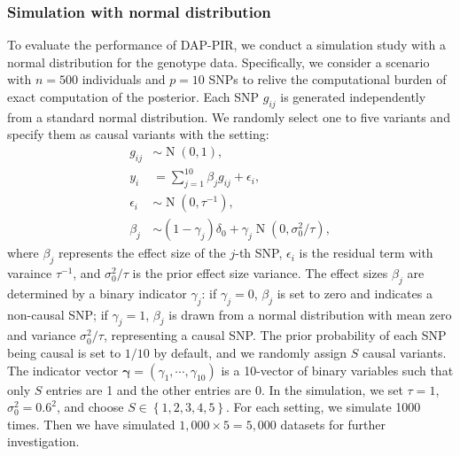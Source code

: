 \documentclass[pdflatex,sn-mathphys-num]{sn-jnl}%
\theoremstyle{thmstyleone}%
\theoremstyle{thmstyletwo}%
\theoremstyle{thmstylethree}%
\begin{document}
\subsubsection{Simulation with normal distribution}
To evaluate the performance of DAP-PIR, we conduct a simulation study with a normal distribution for the genotype data. Specifically, we consider a scenario with $n=500$ individuals and $p=10$ SNPs to relive the computational burden of exact computation of the posterior. Each SNP $g_{ij}$ is generated independently from a standard normal distribution. We randomly select one to five variants and specify them as causal variants with the setting:
\begin{align}
    g_{ij} &\sim \operatorname{N}\left(0,1\right),\\
    y_i &= \sum_{j=1}^{10} \beta_j g_{ij}  + \epsilon_i,\\
    \epsilon_i &\sim \operatorname{N}(0, \tau^{-1}),\\
    \beta_j  &\sim (1-\gamma_j)\delta_0 + \gamma_j\operatorname{N}\left(0, \sigma^2_{0}/\tau\right),
\end{align}
where $\beta_j$ represents the effect size of the $j$-th SNP, $\epsilon_i$ is the residual term with varaince $\tau^{-1}$, and $\sigma_0^2/\tau$ is the prior effect size variance. The effect sizes $\beta_j$ are determined by a binary indicator $\gamma_j$: if $\gamma_j=0$, $\beta_j$ is set to zero and indicates a non-causal SNP; if $\gamma_j=1$, $\beta_j$ is drawn from a normal distribution with mean zero and variance $\sigma^2_0/\tau$, representing a causal SNP. The prior probability of each SNP being causal is set to $1/10$ by default, and we randomly assign $S$ causal variants. The indicator vector $\boldsymbol{\gamma} = \left(\gamma_1,\cdots,\gamma_{10}\right)$ is a 10-vector of binary variables such that only $S$ entries are 1 and the other entries are 0. In the simulation, we set $\tau=1$, $\sigma^2_0 = 0.6^2$, and choose $S \in \left\{1,2,3,4,5\right\}$. For each setting, we simulate 1000 times. Then we have simulated $1,000\times 5 = 5,000$ datasets for further investigation.
\end{document}
